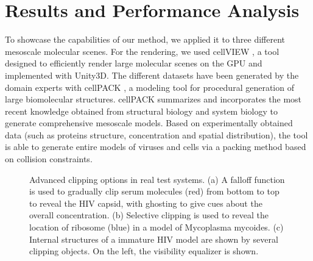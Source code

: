 \section{Results and Performance Analysis}

To showcase the capabilities of our method, we applied it to three different mesoscale molecular scenes. 
For the rendering, we used cellVIEW \cite{muzic15}, a tool designed to efficiently render large molecular scenes on the GPU and implemented with Unity3D. 
The different datasets have been generated by the domain experts with cellPACK \cite{cellpack}, a modeling tool for procedural generation of large biomolecular structures.
cellPACK summarizes and incorporates the most recent knowledge obtained from structural biology and system biology to generate comprehensive mesoscale models. 
Based on experimentally obtained data (such as proteins structure, concentration and spatial distribution), the tool is able to generate entire models of viruses and cells via a packing method based on collision constraints.


\begin{figure}[t]
\centering
{}
\caption{\label{fig:res:res}
Advanced clipping options in real test systems. (a) A falloff function is used to gradually clip serum molecules (red) from bottom to top to reveal the HIV capsid, with ghosting to give cues about the overall concentration. (b) Selective clipping is used to reveal the location of ribosome (blue) in a model of Mycoplasma mycoides.
(c) Internal structures of a immature HIV model are shown by several clipping objects. On the left, the visibility equalizer is shown.}
\vspace{-3mm}
\end{figure}

